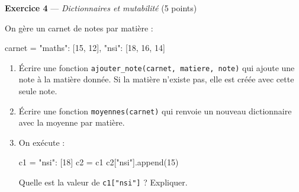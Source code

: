 \bigskip

\textbf{Exercice 4} --- \textit{Dictionnaires et mutabilité} \hfill (5 points)

On gère un carnet de notes par matière :
\begin{python}
carnet = {"maths": [15, 12], "nsi": [18, 16, 14]}
\end{python}

\begin{enumerate}
  \item Écrire une fonction \lstinline{ajouter_note(carnet, matiere, note)}
        qui ajoute une note à la matière donnée. Si la matière n'existe pas,
        elle est créée avec cette seule note.
  \item Écrire une fonction \lstinline{moyennes(carnet)} qui renvoie un
        nouveau dictionnaire avec la moyenne par matière.
  \item On exécute :
\begin{python}
c1 = {"nsi": [18]}
c2 = c1
c2["nsi"].append(15)
\end{python}
        Quelle est la valeur de \lstinline{c1["nsi"]} ? Expliquer.
\end{enumerate}

